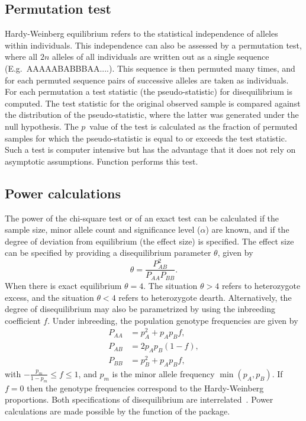 \documentclass[nojss]{jss}
\begin{document}
\subsection{Permutation test}
\label{subsec:permutation}
Hardy-Weinberg equilibrium refers to the statistical independence of alleles within individuals. This independence can also be assessed by
a permutation test, where all $2n$ alleles of all individuals are written out as a single sequence (E.g.\ AAAAABABBBAA....). This sequence is then permuted many times,
and for each permuted sequence pairs of successive alleles are taken as individuals. For each permutation a test statistic (the pseudo-statistic) 
for disequilibrium is computed. The test statistic for the original observed sample is compared against the distribution of the pseudo-statistic,
where the latter was generated under the null hypothesis. The $p$~value of the test is calculated as the fraction of permuted samples for which
the pseudo-statistic is equal to or exceeds the test statistic. Such a test is computer intensive but has the advantage that it does not rely on
asymptotic assumptions. Function  performs this test.

\subsection{Power calculations}
\label{subsec:power}

The power of the chi-square test or of an exact test can be calculated
if the sample size, minor allele count and significance level
($\alpha$) are known, and if the degree of deviation from equilibrium
(the effect size) is specified. The effect size can be specified by
providing a disequilibrium parameter $\theta$, given by
\begin{equation}
\theta = \frac{P_{AB}^2}{P_{AA} P_{BB}}.
\label{eq:theta}
\end{equation}
When there is exact equilibrium $\theta = 4$. The situation $\theta >
4$ refers to heterozygote excess, and the situation $\theta < 4$
refers to heterozygote dearth. Alternatively, the degree of
disequilibrium may also be parametrized by using the inbreeding
coefficient $f$. Under inbreeding, the population genotype frequencies
are given by
\begin{align}
P_{AA} & = p_A^2 + p_A p_B f, \nonumber \\
P_{AB} & = 2 p_A p_B (1 - f), \\
P_{BB} & = p_B^2 + p_A p_B f, \nonumber 
\end{align}
with $-\frac{p_{m}}{1-p_{m}} \leq f \leq 1$, and $p_{m}$ is the minor
allele frequency $\min(p_A,p_B)$. If $f=0$ then the genotype
frequencies correspond to the Hardy-Weinberg proportions. Both
specifications of disequilibrium are
interrelated~\citep{Rohlfs}. Power calculations are made possible by
the  function of the package.
\end{document}
